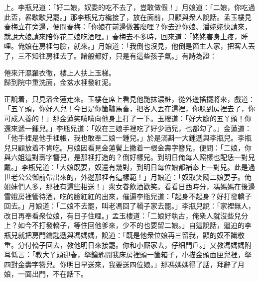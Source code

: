 上。李瓶兒道：「好二娘，奴委的吃不去了，豈敢做假！」月娘道：「二娘，你吃過此盃，畧歇歇兒罷。」那李瓶兒方纔接了，放在面前，只顧與衆人說話。孟玉樓見春梅立在旁邊，便問春梅：「你娘在前邊做甚麼哩？{}你去連你娘、潘姥姥快請來，就說大娘請來陪你花二娘吃酒哩。」春梅去不多時，回來道：「姥姥害身上疼，睡哩。俺娘在房裡勻臉，就來。」月娘道：「我倒也沒見，他倒是箇主人家，把客人丟了，三不知往房裡去了。諸般都好，只是有這些孩子氣。」{}有詩為證：

\begin{myquote}
倦來汗濕羅衣徹，樓上人扶上玉梯。\\歸到院中重洗面，金盆水裡發紅泥。
\end{myquote}

正說着，只見潘金蓮走來。玉樓在席上看見他艷抹濃粧，從外邊搖擺將來，戲道：「五丫頭，你好人兒！今日是你箇驢馬畜，把客人丟在這裡，你躲到房裡去了，你可成人養的！」那金蓮笑嘻嘻向他身上打了一下。{}玉樓道：「好大膽的五丫頭！你還來遞一鍾兒。」李瓶兒道：「奴在三娘手裡吃了好少酒兒，也都勾了。」金蓮道：「他手裡是他手裡帳，我也敢奉二娘一鍾兒。」於是滿斟一大鍾遞與李瓶兒。李瓶兒只顧放着不肯吃。月娘因看見金蓮鬢上撇着一根金壽字簪兒，便問：「二娘，你與六姐這對壽字簪兒，是那裡打造的？倒好樣兒。到明日俺每人照樣也配恁一對兒戴。」李瓶兒道：「大娘既要，奴還有幾對，到明日每位娘都補奉上一對兒。此是過世老公公御前帶出來的，外邊那裡有這樣範！」月娘道：「奴取笑鬬二娘耍子。俺姐妹們人多，那裡有這些相送！」衆女眷飲酒歡笑。看看日西時分，馮媽媽在後邊雪娥房裡管待酒，吃的臉紅紅的出來，催逼李瓶兒道：「起身不起身？好打發轎子回去。」月娘道：「二娘不去罷，叫老馮回了轎子家去罷。」李瓶兒說：「家裡無人，改日再奉看衆位娘，有日子住哩。」孟玉樓道：「二娘好執古，俺衆人就沒些兒分上？如今不打發轎子，等住回他爹來，少不的也要留二娘。」{}自這說話，逼迫的李瓶兒就把房門鑰匙遞與馮媽媽，說道：「既是他衆位娘再三留我，顯的奴不識敬重。分付轎子回去，教他明日來接罷。你和小厮家去，仔細門戶。」又教馮媽媽附耳低言：「教大丫頭迎春，拏鑰匙開我床房裡頭一箇箱子，小描金頭面匣兒裡，拏四對金壽字簪兒。你明日早送來，我要送四位娘。」那馮媽媽得了話，拜辭了月娘，一面出門，不在話下。

